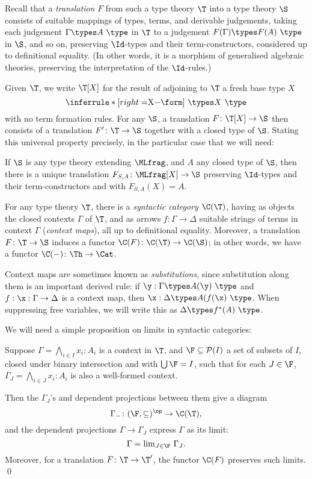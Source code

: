 Recall that a \emph{translation} $F$ from such a type theory $\T$ into a type theory $\S$ consists of suitable mappings of types, terms, and derivable judgements, taking each judgement $\Gamma \types A\ \type$ in $\T$ to a judgement $F(\Gamma) \types F(A)\ \type$ in $\S$, and so on, preserving $\Id$-types and their term-constructors, considered up to definitional equality.  (In other words, it is a morphism of generalised algebraic theories, preserving the interpretation of the $\Id$-rules.)

Given $\T$, we write $\T[X]$ for the result of adjoining to $\T$ a fresh base type $X$
\[\inferrule*[right=$X$-\form]{\ }{ \types X\ \type}\]
with no term formation rules.  For any $\S$, a translation $F \colon \T[X] \to \S$ then consists of a translation $F'\colon \T \to \S$ together with a closed type of $\S$. Stating this universal property precisely, in the particular case that we will need:

\begin{prop} \label{prop:universal-property}If $\S$ is any type theory extending $\MLfrag$, and $A$ any closed type of $\S$, then there is a unique translation $F_{S,A} \colon \MLfrag[X] \to \S$ preserving $\Id$-types and their term-constructors and with $F_{S,A}(X) = A$.
\end{prop}

For any type theory $\T$, there is a \emph{syntactic category} $\C(\T)$, having as objects the closed contexts $\Gamma$ of $\T$, and as arrows $f\colon \Gamma \to \Delta$ suitable strings of terms in context $\Gamma$ (\emph{context maps}), all up to definitional equality.  Moreover, a translation $F \colon \T \to \S$ induces a functor $\C(F)\colon\C(\T) \to \C(\S)$; in other words, we have a functor $\C(-)\colon\Th \to \Cat$.

Context maps are sometimes known as \emph{substitutions}, since substitution along them is an important derived rule: if $\y : \Gamma \types A(\y)\ \type$ and $f: \x:\Gamma \to \Delta$ is a context map, then $\x : \Delta \types A(f(\x)\ \type$.  When suppressing free variables, we will write this as $\Delta \types f^*(A)\ \type$.

We will need a simple proposition on limits in syntactic categories:

\begin{prop} \label{prop:dependent-projections-give-limits}
Suppose $\Gamma = \bigwedge_{i \in I} x_i:A_i$ is a context in $\T$, and $\F \subseteq \mathcal{P}(I)$ a set of subsets of $I$, closed under binary intersection and with $\bigcup \F = I$, such that for each $J \in \F$, $\Gamma_J = \bigwedge_{i \in J} x_i : A_i$ is also a well-formed context.

 Then the $\Gamma_J\!$'s and dependent projections between them give a diagram 
\[\Gamma_{-} \colon (\F, \subseteq)^\op \to \C(\T),\]
and the dependent projections $\Gamma \to \Gamma_J$ express $\Gamma$ as its limit:
\[\Gamma = \lim \! {}_{J \in \F}\ \Gamma_J .\]
Moreover, for a translation $F\colon \T \to \T'$, the functor $\C(F)$ preserves such limits. \qed
\end{prop} 

